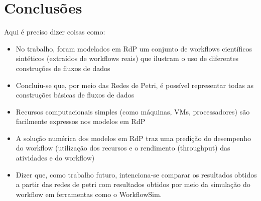 \documentclass[a4paper,10pt]{article}
\begin{document}
\section*{Conclusões}

Aqui é preciso dizer coisas como:

\begin{itemize}
	
	\item No trabalho, foram modelados em RdP um conjunto de workflows científicos sintéticos (extraídos de workflows reais) que ilustram o uso de diferentes construções de fluxos de dados 
	\item Concluiu-se que, por meio das Redes de Petri, é possível representar todas as construções básicas de fluxos de dados
	\item Recursos computacionais simples (como máquinas, VMs, processadores) são facilmente expressos nos modelos em RdP
	\item A solução numérica dos modelos em RdP traz uma predição do desempenho do workflow (utilização dos recursos e o 	rendimento (throughput) das atividades e do workflow)
	\item Dizer que, como trabalho futuro, intenciona-se comparar os resultados obtidos a partir das redes de petri com resultados obtidos por meio da simulação do workflow em ferramentas como o WorkflowSim.

\end{itemize}



\end{document}
